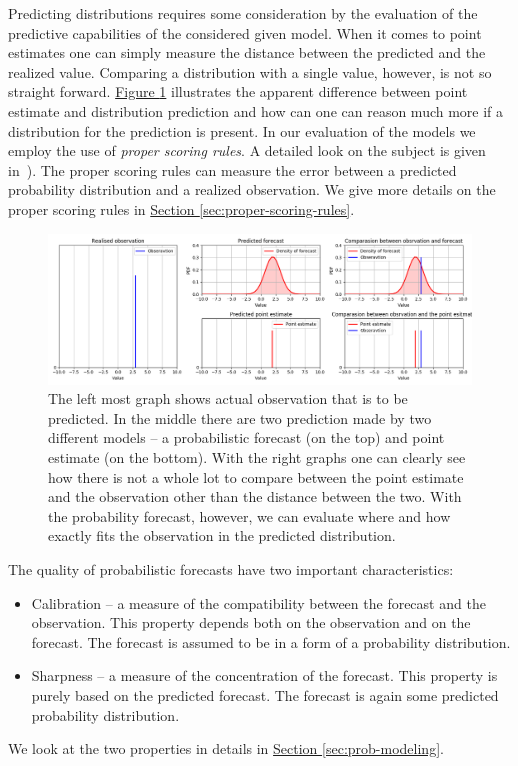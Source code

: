 \documentclass[12pt,a4paper,twoside]{scrartcl}
\numberwithin{equation}{section}
\newcommand{\reffig}[1]{\hyperref[#1]{Figure \ref*{#1}}}
\newcommand{\refsec}[1]{\hyperref[#1]{Section \ref*{#1}}}
\begin{document}
Predicting distributions requires some consideration by the evaluation of the predictive capabilities of the considered given model. When it comes to point estimates one can simply measure the distance between the predicted and the realized value. Comparing a distribution with a single value, however, is not so straight forward. \reffig{fig:point-vs-dist} illustrates the apparent difference between point estimate and distribution prediction and how can one can reason much more if a distribution for the prediction is present. In our evaluation of the models we employ the use of \emph{proper scoring rules}. A detailed look on the subject is given in~\cite{rafteryg2007}). The proper scoring rules can measure the error between a predicted probability distribution and a realized observation. We give more details on the proper scoring rules in \refsec{sec:proper-scoring-rules}.
\begin{center}
  \begin{figure}[H]
    \centering
    \includegraphics[height=0.5\textwidth, width=1.0\textwidth]{figures/distribution_point.png}
    \caption[Point estimate and distribution forecast]{The left most graph shows actual observation that is to be predicted. In the middle there are two prediction made by two different models -- a probabilistic forecast (on the top) and point estimate (on the bottom). With the right graphs one can clearly see how there is not a whole lot to compare between the point estimate and the observation other than the distance between the two. With the probability forecast, however, we can evaluate where and how exactly fits the observation in the predicted distribution.}\label{fig:point-vs-dist}
  \end{figure}
\end{center}
\vfill

The quality of probabilistic forecasts have two important characteristics:
\begin{itemize}
\item Calibration -- a measure of the compatibility between the forecast and the observation. This property depends both on the observation and on the forecast. The forecast is assumed to be in a form of a probability distribution.
\item Sharpness -- a measure of the concentration of the forecast. This property is purely based on the predicted forecast. The forecast is again some predicted probability distribution.
\end{itemize}
We look at the two properties in details in \refsec{sec:prob-modeling}.
\end{document}

